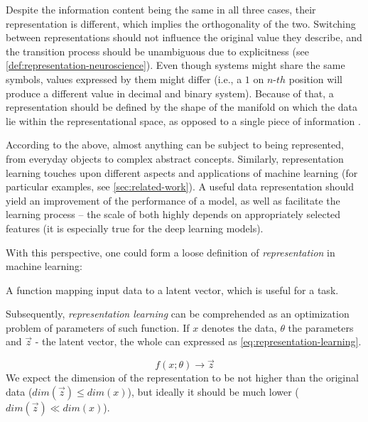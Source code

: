 \vspace{\baselineskip}
Despite the information content being the same in all three cases, their representation is different, which implies the orthogonality of the two. Switching between representations should not influence the original value they describe, and the transition process should be unambiguous due to explicitness (see \autoref{def:representation-neuroscience}). 
Even though systems might share the same symbols, values expressed by them might differ (i.e., a $1$ on $n$-$th$ position will produce a different value in decimal and binary system). Because of that, a representation should be defined by the shape of the manifold on which the data lie within the representational space, as opposed to a single piece of information \cite{Thompson2018}.

\vspace{\baselineskip}
According to the above, almost anything can be subject to being represented, from everyday objects to complex abstract concepts. Similarly, representation learning touches upon different aspects and applications of machine learning (for particular examples, see \autoref{sec:related-work}). A useful data representation should yield an improvement of the performance of a model, as well as facilitate the learning process – the scale of both highly depends on appropriately selected features (it is especially true for the deep learning models).

\vspace{\baselineskip}
With this perspective, one could form a loose definition of \textit{representation} in machine learning:

\begin{definition}[Representation]\label{def:representation-ml}
A function mapping input data to a latent vector, which is useful for a task.
\end{definition}

Subsequently, \textit{representation learning} can be comprehended as an optimization problem of parameters of such function. If $x$ denotes the data, $\theta$ the parameters and $\vec{z}$ - the latent vector, the whole can expressed as \autoref{eq:representation-learning}.

\begin{equation}\label{eq:representation-learning}
    f\left(x;\theta\right)\rightarrow\vec{z}
\end{equation}
We expect the dimension of the representation to be not higher than the original data ($dim\left(\vec{z}\right) \le dim\left(x\right)$), but ideally it should be much lower ($dim\left(\vec{z}\right) \ll dim\left(x\right)$).


